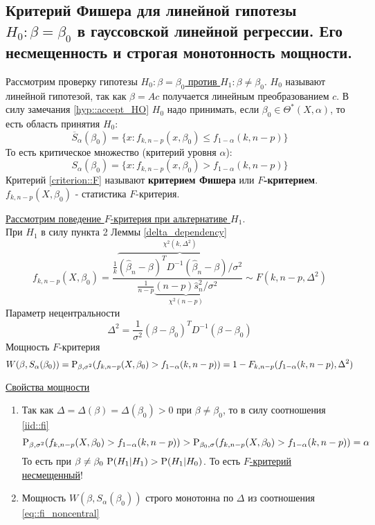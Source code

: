 \subsection{Критерий Фишера для линейной гипотезы $H_0:\beta=\beta_0$ в гауссовской линейной регрессии.
Его несмещенность и строгая монотонность мощности.}
Рассмотрим проверку гипотезы
\underline{$H_0:\beta=\beta_0$ против $H_1:\beta\neq\beta_0$}.
$H_0$ называют линейной гипотезой, так как $\beta=Ac$ получается
линейным преобразованием $c$.
В силу замечания \ref{hyp::accept_HO} $H_0$ надо принимать, если
$\beta_0\in\Theta^*(X,\alpha)$, то есть область принятия $H_0$:
\[\overline{S}_\alpha(\beta_0)=\{x:f_{k,n-p}(x,\beta_0)\leq f_{1-\alpha}(k,n-p)\}\]
То есть критическое множество (критерий уровня $\alpha$):
\begin{equation} \label{criterion::F}
    S_\alpha(\beta_0)=\{x:f_{k,n-p}(x,\beta_0)> f_{1-\alpha}(k,n-p)\}
\end{equation}
Критерий \ref{criterion::F} называют \textbf{критерием Фишера} или \textbf{$F$-критерием}.
$f_{k,n-p}(X,\beta_0)$ - статистика $F$-критерия.

\underline{Рассмотрим поведение $F$-критерия при альтернативе $H_1$}. \\
При $H_1$ в силу пункта 2 Леммы \ref{delta_dependency}
\[f_{k,n-p}(X,\beta_0)=\frac{\frac{1}{k}\overbrace{(\widehat{\beta}_n-\beta)^TD^{-1}(\widehat{\beta}_n-\beta)/\sigma^2}^{\chi^2(k,\Delta^2)}}{\frac{1}{n-p}\underbrace{(n-p)\widehat{s}^2_n/\sigma^2}_{\chi^2(n-p)}}\sim F(k,n-p,\Delta^2)\]
Параметр нецентральности
\begin{equation}\label{eq::fi_noncentral}
    \Delta^2 = \frac{1}{\sigma^2}(\beta-\beta_0)^TD^{-1}(\beta-\beta_0)
\end{equation}
Мощность $F$-критерия
\[W(\beta,S_\alpha(\beta_0))=\P_{\beta,\sigma^2}(f_{k,n-p}(X,\beta_0)>f_{1-\alpha}(k,n-p))=1-F_{k,n-p}(f_{1-\alpha}(k,n-p),\Delta^2)\]

\underline{Свойства мощности}
\begin{enumerate}
    \item Так как $\Delta =\Delta(\beta)=\Delta(\beta_0)>0$ при $\beta\neq\beta_0$,
    то в силу соотношения \ref{iid::fi}
    \[\P_{\beta,\sigma^2}(f_{k,n-p}(X, \beta_0)>f_{1-\alpha}(k,n-p))>\P_{\beta_0,\sigma}(f_{k,n-p}(X,\beta_0)>f_{1-\alpha}(k,n-p))=\alpha\]
    То есть при $\beta\neq\beta_0\ \P(H_1\vert H_1)>\P(H_1\vert H_0)$.
    То есть \underline{$F$-критерий несмещенный}!
    \item Мощность $W(\beta,S_\alpha(\beta_0))$ строго монотонна по $\Delta$
    из соотношения \ref{eq::fi_noncentral}
\end{enumerate}

